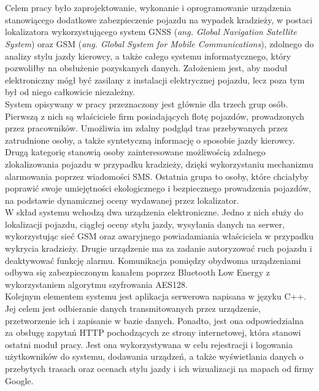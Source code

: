 \thispagestyle{empty}
\\

\\

\begin{singlespacing}

Celem pracy było zaprojektowanie, wykonanie i oprogramowanie urządzenia stanowiącego dodatkowe zabezpieczenie pojazdu na wypadek kradzieży, w postaci lokalizatora wykorzystującego system GNSS (\textit{ang. Global Navigation Satellite System}) oraz GSM (\textit{ang. Global System for Mobile Communications}), zdolnego do analizy stylu jazdy kierowcy, a także całego systemu informatycznego, który pozwoliłby na obsłużenie pozyskanych danych. Założeniem jest, aby moduł elektroniczny mógł być zasilany z instalacji elektrycznej pojazdu, lecz poza tym był od niego całkowicie niezależny.\\

System opisywany w pracy przeznaczony jest głównie dla trzech grup osób. Pierwszą z nich są właściciele firm posiadających flotę pojazdów, prowadzonych przez pracowników. Umożliwia im zdalny podgląd tras przebywanych przez zatrudnione osoby, a także syntetyczną informację o sposobie jazdy kierowcy. Drugą kategorię stanowią osoby zainteresowane możliwością zdalnego zlokalizowania pojazdu w przypadku kradzieży, dzięki wykorzystaniu mechanizmu alarmowania poprzez wiadomości SMS. Ostatnia grupa to osoby, które chciałyby poprawić swoje umiejętności ekologicznego i bezpiecznego prowadzenia pojazdów, na podstawie dynamicznej oceny wydawanej przez lokalizator. \\

W skład systemu wchodzą dwa urządzenia elektroniczne. Jedno z nich służy do lokalizacji pojazdu, ciągłej oceny stylu jazdy, wysyłania danych na serwer, wykorzystując sieć GSM oraz awaryjnego powiadamiania właściciela w przypadku wykrycia kradzieży. Drugie urządzenie ma za zadanie autoryzować ruch pojazdu i deaktywować funkcję alarmu. Komunikacja pomiędzy obydwoma urządzeniami odbywa się zabezpieczonym kanałem poprzez Bluetooth Low Energy z wykorzystaniem algorytmu szyfrowania AES128. \\

Kolejnym elementem systemu jest aplikacja serwerowa napisana w języku C++. Jej celem jest odbieranie danych transmitowanych przez urządzenie, przetworzenie ich i zapisanie w bazie danych. Ponadto, jest ona odpowiedzialna za obsługę zapytań HTTP pochodzących ze strony internetowej, która stanowi ostatni moduł pracy. Jest ona wykorzystywana w celu rejestracji i logowania użytkowników do systemu, dodawania urządzeń, a także wyświetlania danych o przebytych trasach oraz ocenach stylu jazdy i ich wizualizacji na mapach od firmy Google. \\


\end{singlespacing}
